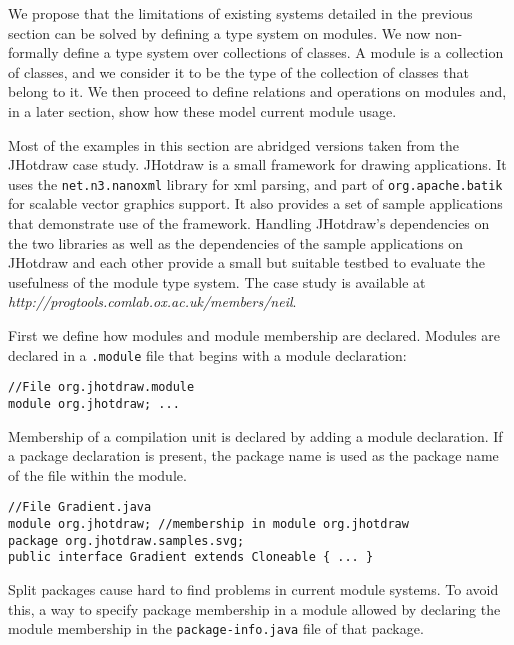 
We propose that the limitations of existing systems detailed in the previous section
can be solved by defining a type system on modules. 
We now non-formally define a type system over collections of classes. 
A module is a collection of classes, and we consider it to be the type of 
the collection of classes that belong to it. We then proceed to define
relations and operations on modules and, in a later section, show how
these model current module usage. 

Most of the examples in this section are abridged versions taken from the JHotdraw case study. 
JHotdraw\cite{jhotdraw} is a small framework for drawing applications. It
uses the \texttt{net.n3.nanoxml} library for xml parsing, and part of 
\texttt{org.apache.batik} for scalable vector graphics support. It also
provides a set of sample applications that demonstrate use of the framework.
Handling JHotdraw's dependencies on the two libraries as well as the dependencies
of the sample applications on JHotdraw and each other provide a small but
suitable testbed to evaluate the usefulness of the module type system.
The case study is available at \textit{http://progtools.comlab.ox.ac.uk/members/neil}. 


First we define how modules and module membership are declared. 
Modules are declared in a {\tt .module} file that begins with a module
declaration:

\begin{lstlisting}
//File org.jhotdraw.module
module org.jhotdraw; ...
\end{lstlisting}

Membership of a compilation unit is 
declared by adding a module declaration. If a package declaration is present, 
the package name is used as the package name of the file within the module.

\begin{lstlisting}
//File Gradient.java
module org.jhotdraw; //membership in module org.jhotdraw
package org.jhotdraw.samples.svg;
public interface Gradient extends Cloneable { ... }
\end{lstlisting}

Split packages cause hard to find problems in current module systems\cite{iJAMComments}. To avoid this, 
a way to specify package membership in a module allowed by declaring the module membership
in the {\tt package-info.java} file of that package.

